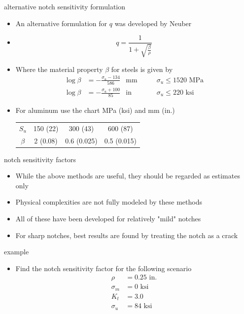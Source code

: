 \documentclass[10pt]{beamer}
\begin{document}
\begin{frame}{alternative notch sensitivity formulation}
	\begin{itemize}[<+->]
		\item An alternative formulation for $q$ was developed by Neuber
		\item[] \begin{equation}
		q = \frac{1}{1+\sqrt{\frac{\beta}{\rho}}}
		\end{equation}
		\item Where the material property $\beta$ for steels is given by
		\begin{align}
		\log \beta &= -\frac{\sigma_u - 134}{586} & \text{mm} & \qquad \sigma_u \le 1520 \text{ MPa}\\
		\log \beta &= -\frac{\sigma_u + 100}{85}& \text{in} & \qquad \sigma_u \le 220 \text{ ksi}
		\end{align}
		\item For aluminum use the chart MPa (ksi) and mm (in.)
		\begin{tabular}{c|ccc}
			$S_u$ & 150 (22) & 300 (43) & 600 (87) \\ 
			$\beta$ & 2 (0.08) & 0.6 (0.025) & 0.5 (0.015) \\ 
		\end{tabular} 
	\end{itemize}
\end{frame}

\begin{frame}{notch sensitivity factors}
	\begin{itemize}[<+->]
		\item While the above methods are useful, they should be regarded as estimates only
		\item Physical complexities are not fully modeled by these methods
		\item All of these have been developed for relatively "mild" notches
		\item For sharp notches, best results are found by treating the notch as a crack
	\end{itemize}
\end{frame}

\begin{frame}{example}
	\begin{itemize}
		\item Find the notch sensitivity factor for the following scenario
		\begin{align*}
		\rho &= 0.25 \text{ in.}\\
		\sigma_m &= 0 \text{ ksi}\\
		K_t &= 3.0\\
		\sigma_u &= 84 \text{ ksi}
		\end{align*}
	\end{itemize}
\end{frame}
\end{document}
